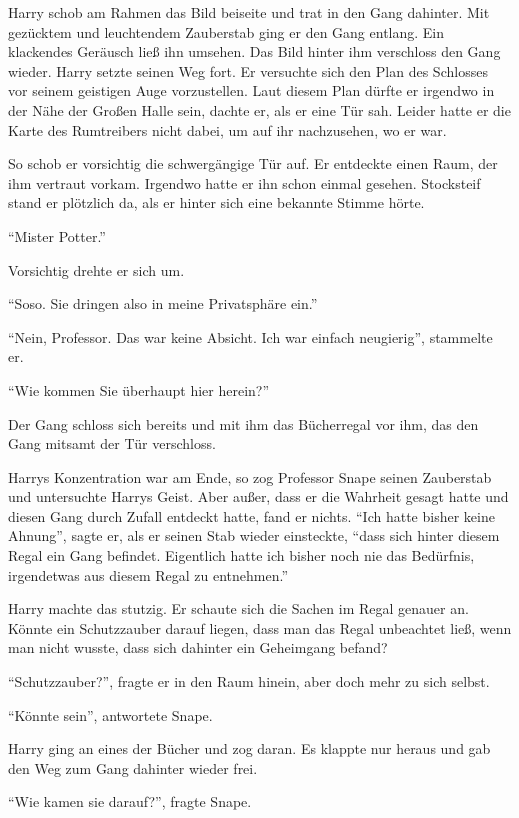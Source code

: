 Harry schob am Rahmen das Bild beiseite und trat in den Gang dahinter. Mit gezücktem und leuchtendem Zauberstab ging er den Gang entlang. Ein klackendes Geräusch ließ ihn umsehen. Das Bild hinter ihm verschloss den Gang wieder. Harry setzte seinen Weg fort. Er versuchte sich den Plan des Schlosses vor seinem geistigen Auge vorzustellen. Laut diesem Plan dürfte er irgendwo in der Nähe der Großen Halle sein, dachte er, als er eine Tür sah. Leider hatte er die Karte des Rumtreibers nicht dabei, um auf ihr nachzusehen, wo er war.

So schob er vorsichtig die schwergängige Tür auf. Er entdeckte einen Raum, der ihm vertraut vorkam. Irgendwo hatte er ihn schon einmal gesehen. Stocksteif stand er plötzlich da, als er hinter sich eine bekannte Stimme hörte.

\enquote{Mister Potter.}

Vorsichtig drehte er sich um.

\enquote{Soso. Sie dringen also in meine Privatsphäre ein.}

\enquote{Nein, Professor. Das war keine Absicht. Ich war einfach neugierig}, stammelte er.

\enquote{Wie kommen Sie überhaupt hier herein?}

Der Gang schloss sich bereits und mit ihm das Bücherregal vor ihm, das den Gang mitsamt der Tür verschloss.

Harrys Konzentration war am Ende, so zog Professor Snape seinen Zauberstab und untersuchte Harrys Geist. Aber außer, dass er die Wahrheit gesagt hatte und diesen Gang durch Zufall entdeckt hatte, fand er nichts. \enquote{Ich hatte bisher keine Ahnung}, sagte er, als er seinen Stab wieder einsteckte, \enquote{dass sich hinter diesem Regal ein Gang befindet. Eigentlich hatte ich bisher noch nie das Bedürfnis, irgendetwas aus diesem Regal zu entnehmen.}

Harry machte das stutzig. Er schaute sich die Sachen im Regal genauer an. Könnte ein Schutzzauber darauf liegen, dass man das Regal unbeachtet ließ, wenn man nicht wusste, dass sich dahinter ein Geheimgang befand?

\enquote{Schutzzauber?}, fragte er in den Raum hinein, aber doch mehr zu sich selbst.

\enquote{Könnte sein}, antwortete Snape.

Harry ging an eines der Bücher und zog daran. Es klappte nur heraus und gab den Weg zum Gang dahinter wieder frei.

\enquote{Wie kamen sie darauf?}, fragte Snape.

